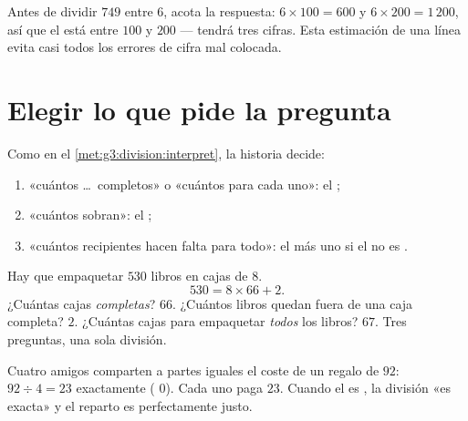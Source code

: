 \begin{example}\label{ex:g4:division:size}
Antes de dividir $749$ entre $6$, acota la respuesta:
$6 \times 100 = 600$ y $6 \times 200 = 1\,200$, así que el  está
entre $100$ y $200$ --- tendrá tres cifras. Esta estimación de una línea
evita casi todos los errores de cifra mal colocada.
\end{example}

\section{Elegir lo que pide la pregunta}

\begin{method}\label{met:g4:division:interpret}
Como en el \cref{met:g3:division:interpret}, la historia decide:
\begin{enumerate}
  \item «cuántos \dots\ completos» o «cuántos para cada uno»: el ;
  \item «cuántos sobran»: el ;
  \item «cuántos recipientes hacen falta para todo»: el  más
        uno si el  no es .
\end{enumerate}
\end{method}

\begin{example}\label{ex:g4:division:problem}
Hay que empaquetar $530$ libros en cajas de $8$.
\[
530 = 8 \times 66 + 2 .
\]
¿Cuántas cajas \emph{completas}? $66$. ¿Cuántos libros quedan fuera de una caja
completa? $2$. ¿Cuántas cajas para empaquetar \emph{todos} los libros? $67$.
Tres preguntas, una sola división.
\end{example}

\begin{example}\label{ex:g4:division:money}
Cuatro amigos comparten a partes iguales el coste de un regalo de $92$:
$92 \div 4 = 23$ exactamente ( $0$). Cada uno paga $23$. Cuando el
 es , la división «es exacta» y el reparto
es perfectamente justo.
\end{example}

